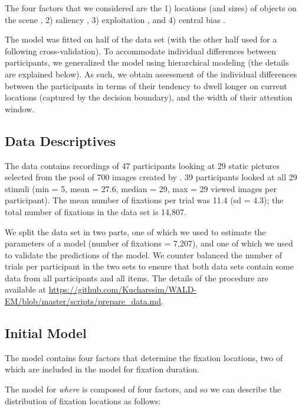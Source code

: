 \documentclass{article}
\begin{document}
The four factors that we considered are the 1) locations (and sizes) of objects on the scene \citep{xu2014beyond,renswoude2019object_familiarity}, 2) saliency \citep{itti1998model,itti2000saliency,itti2001computational}, 3) exploitation \citep[i.e., tendency to make repeated fixations in a relative proximity to a previous fixation;][]{malem2020exploration}, and 4) central bias \citep{renswoude2019central}. 

The model was fitted on half of the data set (with the other half used for a following cross-validation). To accommodate individual differences between participants, we generalized the model using hierarchical modeling (the details are explained below). As such, we obtain assessment of the individual differences between the participants in terms of their tendency to dwell longer on current locations (captured by the decision boundary), and the width of their attention window.

\subsection{Data Descriptives}

The data contains recordings of 47 participants looking at 29 static pictures selected from the pool of 700 images created by \citet{xu2014beyond}. 39 participants looked at all 29 stimuli (min = 5, mean = 27.6, median = 29, max = 29 viewed images per participant). The mean number of fixations per trial was 11.4 (sd = 4.3); the total number of fixations in the data set is 14,807.

We split the data set in two parts, one of which we used to estimate the parameters of a model (number of fixations = 7,207), and one of which we used to validate the predictions of the model. We counter balanced the number of trials per participant in the two sets to ensure that both data sets contain some data from all participants and all items. The details of the procedure are available at \url{https://github.com/Kucharssim/WALD-EM/blob/master/scripts/prepare\_data.md}. 

\subsection{Initial Model}

The model contains four factors that determine the fixation locations, two of which are included in the model for fixation duration.

The model for \textit{where} is composed of four factors, and so we can describe the distribution of fixation locations as follows:
\end{document}

